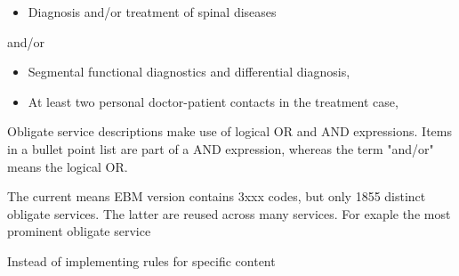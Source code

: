 \begin{itemize}
    \item Diagnosis and/or treatment of spinal diseases
\end{itemize}
and/or
\begin{itemize}
    \item Segmental functional diagnostics and differential diagnosis,
    \item At least two personal doctor-patient contacts in the treatment case,
\end{itemize}

Obligate service descriptions make use of logical OR and AND expressions.
Items in a bullet point list are part of a AND expression, whereas the term "and/or" means the logical OR.

The current means EBM version contains 3xxx codes, but only 1855 distinct obligate services.
The latter are reused across many services. For exaple the most prominent obligate service

Instead of implementing rules for specific content


\